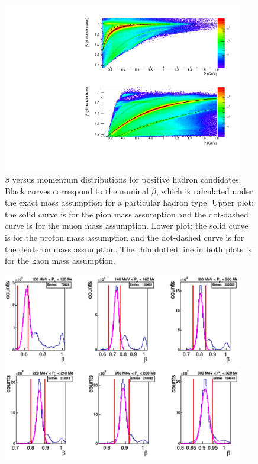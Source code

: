 \documentclass[,superscriptaddress,showpacs,amssymb,amsmath,amsfonts,linenumbers,article]{revtex4-1}
\begin{document}
\begin{enumerate}[label=\textbf{\arabic*}.]
\begin{figure}[!ht]
\begin{center}
\includegraphics[width=10.5cm]{pictures/hadr_id.pdf}
\end{center}
\caption{\small $\beta$ versus momentum distributions for positive hadron candidates. Black curves correspond to the nominal $\beta$, which is calculated under the exact mass assumption for a particular hadron type. Upper plot: the solid curve is for the pion mass assumption and the dot-dashed curve is for the muon mass assumption. Lower plot: the solid curve is for the proton mass assumption and the  dot-dashed curve is for the deuteron mass assumption. The thin dotted line in both plots is for the kaon mass assumption. }  
\end{figure}
\begin{figure}[!ht]
\begin{center}
\includegraphics[width=10.5cm]{pictures/pip_id1.pdf}
\includegraphics[width=10.5cm]{pictures/pip_id2.pdf}
\end{center}

\end{figure}
\end{enumerate}
\end{document}
